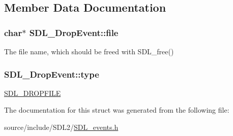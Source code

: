 \subsection{Member Data Documentation}
\hypertarget{struct_s_d_l___drop_event_abc41ef4beb62e1d8b56827128b29585f}{}
\subsubsection[{file}]{\setlength{\rightskip}{0pt plus 5cm}char$\ast$ S\+D\+L\+\_\+\+Drop\+Event\+::file}\label{struct_s_d_l___drop_event_abc41ef4beb62e1d8b56827128b29585f}
The file name, which should be freed with S\+D\+L\+\_\+free() \hypertarget{struct_s_d_l___drop_event_a5ea27cfaa5f8d4940e9a69b68b3cc035}{}
\subsubsection[{type}]{ S\+D\+L\+\_\+\+Drop\+Event\+::type}\label{struct_s_d_l___drop_event_a5ea27cfaa5f8d4940e9a69b68b3cc035}
\hyperlink{_s_d_l__events_8h_a3b589e89be6b35c02e0dd34a55f3fccaad9238862d7aeaebff88be6453ee0fbab}{S\+D\+L\+\_\+\+D\+R\+O\+P\+F\+I\+L\+E} 

The documentation for this struct was generated from the following file\+:\begin{DoxyCompactItemize}
\item 
source/include/\+S\+D\+L2/\hyperlink{_s_d_l__events_8h}{S\+D\+L\+\_\+events.\+h}\end{DoxyCompactItemize}
